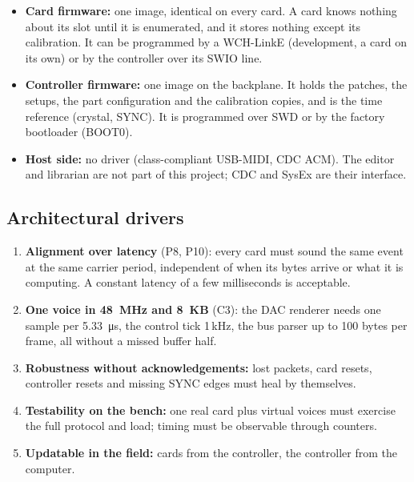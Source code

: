 \begin{itemize}
  \item \textbf{Card firmware:} one image, identical on every card. A card knows nothing about its slot until it is
    enumerated, and it stores nothing except its calibration. It can be programmed by a WCH-LinkE (development, a card
    on its own) or by the controller over its SWIO line.
  \item \textbf{Controller firmware:} one image on the backplane. It holds the patches, the setups, the part
    configuration and the calibration copies, and is the time reference (crystal, SYNC). It is programmed over SWD
    or by the factory bootloader (BOOT0).
  \item \textbf{Host side:} no driver (class-compliant USB-MIDI, CDC ACM). The editor and librarian are not part
    of this project; CDC and SysEx are their interface.
\end{itemize}

\subsection{Architectural drivers}

\begin{enumerate}
  \item \textbf{Alignment over latency} (P8, P10): every card must sound the same event at the same carrier period,
    independent of when its bytes arrive or what it is computing. A constant latency of a few milliseconds is
    acceptable.
  \item \textbf{One voice in \SI{48}{MHz} and \SI{8}{KB}} (C3): the DAC renderer needs one sample per
    \SI{5.33}{\micro s}, the control tick 1\,kHz, the bus parser up to 100 bytes per frame, all without a missed buffer
    half.
  \item \textbf{Robustness without acknowledgements:} lost packets, card resets, controller resets and missing SYNC
    edges must heal by themselves.
  \item \textbf{Testability on the bench:} one real card plus virtual voices must exercise the full protocol and load;
    timing must be observable through counters.
  \item \textbf{Updatable in the field:} cards from the controller, the controller from the computer.
\end{enumerate}

